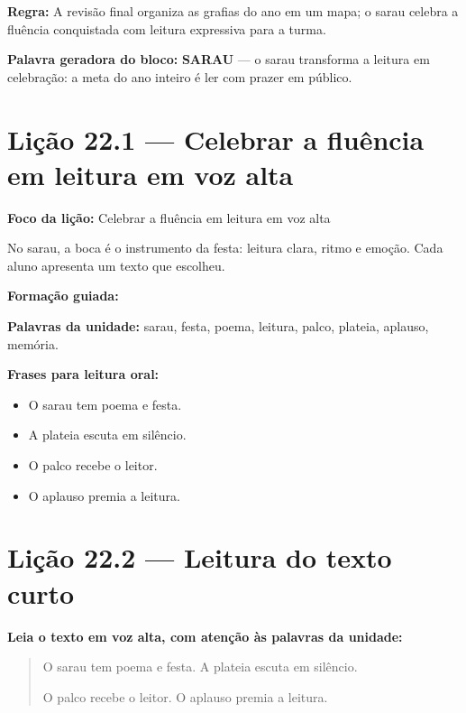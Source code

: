 \textbf{Regra:} A revisão final organiza as grafias do ano em um mapa; o sarau celebra a fluência conquistada com leitura expressiva para a turma.

\textbf{Palavra geradora do bloco:} \textbf{SARAU} --- o sarau transforma a leitura em celebração: a meta do ano inteiro é ler com prazer em público.

\section{Lição 22.1 --- Celebrar a fluência em leitura em voz alta}

\textbf{Foco da lição:} Celebrar a fluência em leitura em voz alta


\begin{boquinha}
No sarau, a boca é o instrumento da festa: leitura clara, ritmo e emoção. Cada aluno apresenta um texto que escolheu.
\end{boquinha}

\noindent\textbf{Formação guiada:}

\begin{center}
\end{center}

\noindent\textbf{Palavras da unidade:} sarau, festa, poema, leitura, palco, plateia, aplauso, memória.

\noindent\textbf{Frases para leitura oral:}
\begin{itemize}[leftmargin=1.6em]
  \item O sarau tem poema e festa.
  \item A plateia escuta em silêncio.
  \item O palco recebe o leitor.
  \item O aplauso premia a leitura.
\end{itemize}

\section{Lição 22.2 --- Leitura do texto curto}

\noindent\textbf{Leia o texto em voz alta, com atenção às palavras da unidade:}


\begin{quote}
O sarau tem poema e festa. A plateia escuta em silêncio.

O palco recebe o leitor. O aplauso premia a leitura.
\end{quote}

